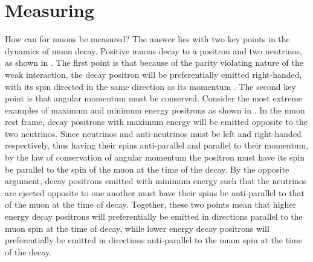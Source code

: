 





\section{Measuring \texorpdfstring{\wa}{wa}}
\label{section:WaIntro}

How can \wa for muons be measured? The answer lies with two key points in the dynamics of muon decay. Positive muons decay to a positron and two neutrinos, as shown in . The first point is that because of the parity violating nature of the weak interaction, the decay positron will be preferentially emitted right-handed, with its spin directed in the same direction as its momentum \cite{Bucksbaum}. The second key point is that angular momentum must be conserved. Consider the most extreme examples of maximum and minimum energy positrons as shown in . In the muon rest frame, decay positrons with maximum energy will be emitted opposite to the two neutrinos. Since neutrinos and anti-neutrinos must be left and right-handed respectively, thus having their spins anti-parallel and parallel to their momentum, by the law of conservation of angular momentum the positron must have its spin be parallel to the spin of the muon at the time of the decay. By the opposite argument, decay positrons emitted with minimum energy such that the neutrinos are ejected opposite to one another must have their spins be anti-parallel to that of the muon at the time of decay. Together, these two points mean that higher energy decay positrons will preferentially be emitted in directions parallel to the muon spin at the time of decay, while lower energy decay positrons will preferentially be emitted in directions anti-parallel to the muon spin at the time of the decay. 

